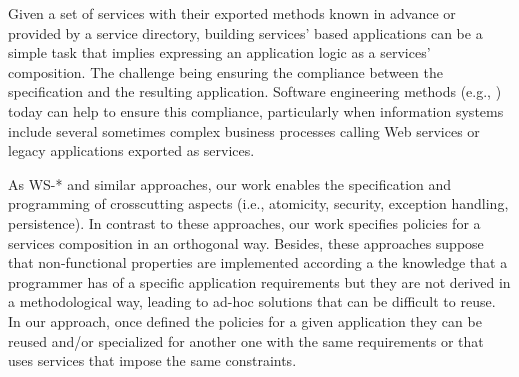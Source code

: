 Given a set of services with their exported methods known in advance or provided by a  service directory, building services' based applications can be  a simple task that implies expressing an application logic as a services' composition. The challenge being  ensuring the compliance between the specification and the resulting application. Software engineering methods (e.g., \cite{1,2,decastro1,PapazoglouH06}) today can help to ensure this compliance, particularly when information systems include several sometimes complex business processes calling Web services or legacy applications exported as services.

As WS-* and similar approaches, our work enables the specification and programming of crosscutting aspects (i.e., atomicity, security, exception handling, persistence).
In contrast to these approaches, our work specifies policies for a services composition in an orthogonal way. Besides, these approaches suppose that non-functional properties are implemented according a the knowledge that a programmer has of a specific application requirements but they are not derived in a methodological way, leading to ad-hoc solutions that can be difficult to reuse. In our approach, once defined the policies for a given application they can be reused and/or specialized for another one with the same requirements or that uses services that impose the same constraints.